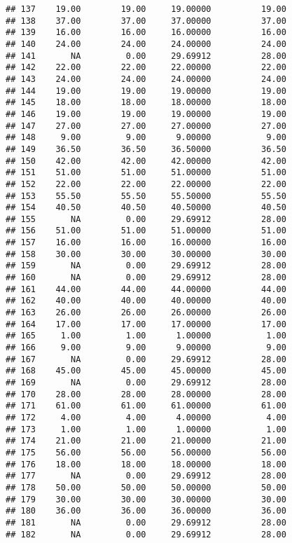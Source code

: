 \documentclass[
]{article}
\begin{document}
\begin{verbatim}
## 137    19.00        19.00     19.00000          19.00
## 138    37.00        37.00     37.00000          37.00
## 139    16.00        16.00     16.00000          16.00
## 140    24.00        24.00     24.00000          24.00
## 141       NA         0.00     29.69912          28.00
## 142    22.00        22.00     22.00000          22.00
## 143    24.00        24.00     24.00000          24.00
## 144    19.00        19.00     19.00000          19.00
## 145    18.00        18.00     18.00000          18.00
## 146    19.00        19.00     19.00000          19.00
## 147    27.00        27.00     27.00000          27.00
## 148     9.00         9.00      9.00000           9.00
## 149    36.50        36.50     36.50000          36.50
## 150    42.00        42.00     42.00000          42.00
## 151    51.00        51.00     51.00000          51.00
## 152    22.00        22.00     22.00000          22.00
## 153    55.50        55.50     55.50000          55.50
## 154    40.50        40.50     40.50000          40.50
## 155       NA         0.00     29.69912          28.00
## 156    51.00        51.00     51.00000          51.00
## 157    16.00        16.00     16.00000          16.00
## 158    30.00        30.00     30.00000          30.00
## 159       NA         0.00     29.69912          28.00
## 160       NA         0.00     29.69912          28.00
## 161    44.00        44.00     44.00000          44.00
## 162    40.00        40.00     40.00000          40.00
## 163    26.00        26.00     26.00000          26.00
## 164    17.00        17.00     17.00000          17.00
## 165     1.00         1.00      1.00000           1.00
## 166     9.00         9.00      9.00000           9.00
## 167       NA         0.00     29.69912          28.00
## 168    45.00        45.00     45.00000          45.00
## 169       NA         0.00     29.69912          28.00
## 170    28.00        28.00     28.00000          28.00
## 171    61.00        61.00     61.00000          61.00
## 172     4.00         4.00      4.00000           4.00
## 173     1.00         1.00      1.00000           1.00
## 174    21.00        21.00     21.00000          21.00
## 175    56.00        56.00     56.00000          56.00
## 176    18.00        18.00     18.00000          18.00
## 177       NA         0.00     29.69912          28.00
## 178    50.00        50.00     50.00000          50.00
## 179    30.00        30.00     30.00000          30.00
## 180    36.00        36.00     36.00000          36.00
## 181       NA         0.00     29.69912          28.00
## 182       NA         0.00     29.69912          28.00

\end{verbatim}
\end{document}
